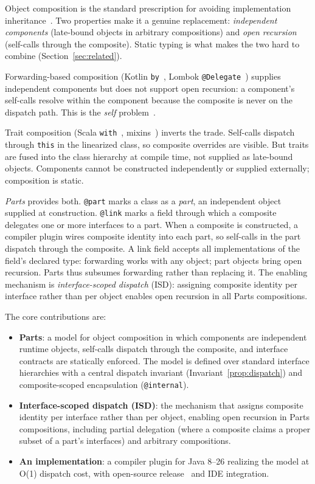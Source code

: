 \documentclass[sigplan,10pt,review,anonymous]{acmart}
\theoremstyle{acmplain}
\newcommand{\code}[1]{\texttt{#1}}
\begin{document}
Object composition is the standard prescription for avoiding implementation
inheritance~\cite{gamma1994}. Two properties make it a genuine replacement:
\emph{independent components} (late-bound objects in arbitrary compositions) and \emph{open recursion} (self-calls through the composite).
Static typing is what makes the two hard to combine (Section~\ref{sec:related}).

Forwarding-based composition (Kotlin \code{by}~\cite{kotlin}, Lombok
\code{@Delegate}~\cite{lombok}) supplies independent components but does not
support open recursion: a component's self-calls resolve within the component
because the composite is never on the dispatch path. This is
the \emph{self} problem~\cite{lieberman1986,self1987}.

Trait composition (Scala \code{with}~\cite{odersky2005},
mixins~\cite{bracha1990}) inverts the trade. Self-calls dispatch through
\code{this} in the linearized class, so composite overrides are visible. But
traits are fused into the class hierarchy at compile time, not supplied as
late-bound objects. Components cannot be constructed independently or supplied externally;
composition is static.

\emph{Parts} provides both. \code{@part} marks a class as a \emph{part}, an independent object supplied at construction. \code{@link} marks a field through which a composite
delegates one or more interfaces to a part. When a composite is constructed, a
compiler plugin wires composite identity into each part, so self-calls in
the part dispatch through the composite. A link field accepts all
implementations of the field's declared type: forwarding works with any object; part objects bring open recursion. Parts thus subsumes forwarding rather than replacing
it. The enabling mechanism is
\emph{interface-scoped dispatch} (ISD): assigning composite identity per
interface rather than per object enables open recursion in all Parts compositions.

The core contributions are:

\begin{itemize}
  \item \textbf{Parts}: a model for object composition in which
        components are independent runtime objects, self-calls dispatch through
        the composite, and interface contracts are statically enforced.
        The model is defined over standard interface hierarchies with a central
        dispatch invariant (Invariant~\ref{prop:dispatch}) and
        composite-scoped encapsulation (\code{@internal}).
  \item \textbf{Interface-scoped dispatch (ISD)}: the mechanism that assigns
        composite identity per interface rather than per object, enabling
        open recursion in Parts compositions, including partial
        delegation (where a composite claims a proper subset of a part's
        interfaces) and arbitrary compositions.
  \item \textbf{An implementation}: a compiler plugin for
        Java 8--26 realizing the model at O(1) dispatch cost, with open-source
        release~\cite{mckinney2026} and IDE integration.
\end{itemize}
\end{document}
